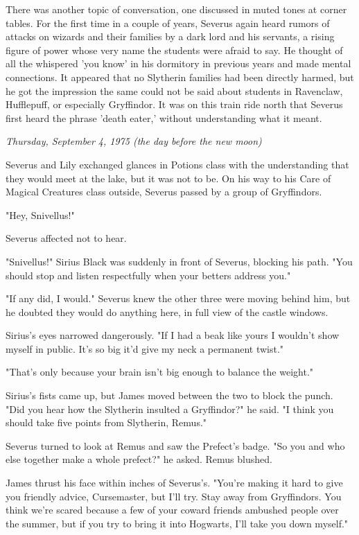 \documentclass[a4paper,11pt]{article}
\begin{document}
There was another topic of conversation, one discussed in muted tones at corner tables. For the first time in a couple of years, Severus again heard rumors of attacks on wizards and their families by a dark lord and his servants, a rising figure of power whose very name the students were afraid to say. He thought of all the whispered 'you know' in his dormitory in previous years and made mental connections. It appeared that no Slytherin families had been directly harmed, but he got the impression the same could not be said about students in Ravenclaw, Hufflepuff, or especially Gryffindor. It was on this train ride north that Severus first heard the phrase 'death eater,' without understanding what it meant.

\emph{Thursday, September 4, 1975 (the day before the new moon)}

Severus and Lily exchanged glances in Potions class with the understanding that they would meet at the lake, but it was not to be. On his way to his Care of Magical Creatures class outside, Severus passed by a group of Gryffindors.

"Hey, Snivellus!"

Severus affected not to hear.

"Snivellus!" Sirius Black was suddenly in front of Severus, blocking his path. "You should stop and listen respectfully when your betters address you."

"If any did, I would." Severus knew the other three were moving behind him, but he doubted they would do anything here, in full view of the castle windows.

Sirius's eyes narrowed dangerously. "If I had a beak like yours I wouldn't show myself in public. It's so big it'd give my neck a permanent twist."

"That's only because your brain isn't big enough to balance the weight."

Sirius's fists came up, but James moved between the two to block the punch. "Did you hear how the Slytherin insulted a Gryffindor?" he said. "I think you should take five points from Slytherin, Remus."

Severus turned to look at Remus and saw the Prefect's badge. "So you and who else together make a whole prefect?" he asked. Remus blushed.

James thrust his face within inches of Severus's. "You're making it hard to give you friendly advice, Cursemaster, but I'll try. Stay away from Gryffindors. You think we're scared because a few of your coward friends ambushed people over the summer, but if you try to bring it into Hogwarts, I'll take you down myself."
\end{document}

